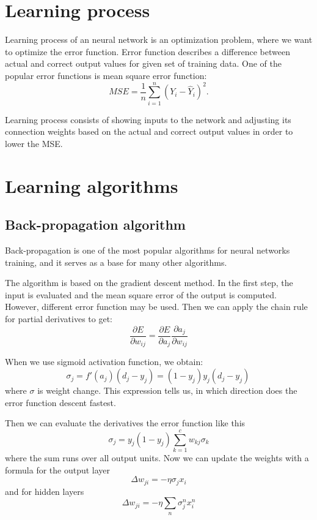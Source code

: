 \section{Learning process}
Learning process of an neural network is an optimization problem, where we want to optimize the error function. Error function describes a difference between actual and correct output values for given set of training data. One of the popular error functions is mean square error function:
\begin{equation*}
MSE  =  \frac{1}{n} \sum_{i=1}^{n} (Y_{i} - \hat{Y}_{i})^2.
\end{equation*}

Learning process consists of showing inputs to the network and adjusting its connection weights based on the actual and correct output values in order to lower the MSE.

\section{Learning algorithms}

\subsection{Back-propagation algorithm}
Back-propagation is one of the most popular algorithms for neural networks training, and it serves as a base for many other algorithms.

The algorithm is based on the gradient descent method. In the first step, the input is evaluated and the mean square error of the output is computed. However, different error function may be used. Then we can apply the chain rule for partial derivatives to get:
\begin{equation*}
\frac{\partial E}{\partial w_{ij}} = \frac{\partial E}{\partial a_{j}} \frac{\partial a_{j}}{\partial w_{ij}}
\end{equation*}

When we use sigmoid activation function, we obtain:
\begin{equation*}
\sigma_{j}  =  f'(a_{j})(d_{j} - y_{j}) = (1-y_{j})y_{j}(d_{j}-y_{j})\,
\end{equation*}
where $\sigma$ is weight change. This expression tells us, in which direction does the error function descent fastest.

Then we can evaluate the derivatives the error function like this
\begin{equation*}
\sigma_{j} = y_{j}(1-y_{j}) \sum_{k=1}^{c} w_{kj} \sigma_{k}
\end{equation*}
where the sum runs over all output units. Now we can update the weights with a formula for the output layer
\begin{equation*}
\Delta w_{ji} = - \eta \sigma_{j} x_{i}
\end{equation*}
and for hidden layers
\begin{equation*}
\Delta w_{ji} =  - \eta \sum_{n} \sigma_{j}^{n} x_{i}^{n}
\end{equation*}

